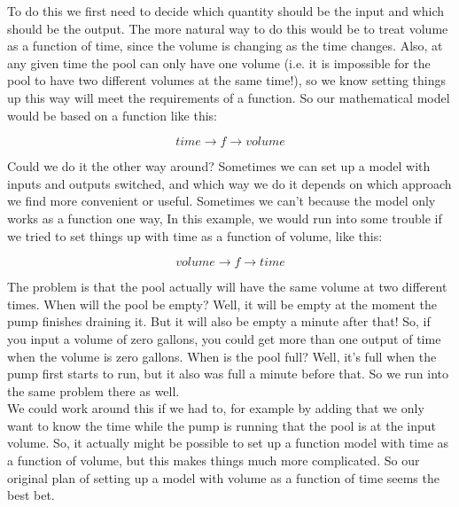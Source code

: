 To do this we first need to decide which quantity should be the input and which should be the output. The more natural way to do this would be to treat volume as a function of time, since the volume is changing as the time changes. Also, at any given time the pool can only have one volume (i.e. it is impossible for the pool to have two different volumes at the same time!), so we know setting things up this way will meet the requirements of a function. So our mathematical model would be based on a function like this:

\begin{equation*}
	time \rightarrow \boxed{f} \rightarrow volume
\end{equation*}

Could we do it the other way around? Sometimes we can set up a model with inputs and outputs switched, and which way we do it depends on which approach we find more convenient or useful.  Sometimes we can’t because the model only works as a function one way, In this example, we would run into some trouble if we tried to set things up with time as a function of volume, like this:

\begin{equation*}
	volume \rightarrow \boxed{f} \rightarrow time
\end{equation*}

The problem is that the pool actually will have the same volume at two different times. When will the pool be empty? Well, it will be empty at the moment the pump finishes draining it. But it will also be empty a minute after that! So, if you input a volume of zero gallons, you could get more than one output of time when the volume is zero gallons. When is the pool full? Well, it’s full when the pump first starts to run, but it also was full a minute before that. So we run into the same
problem there as well.\\

We could work around this if we had to, for example by adding that we only want to know the time while the pump is running that the pool is at the input volume. So, it actually might be possible to set up a function model with time as a function of volume, but this makes things much more complicated. So our original plan of setting up a model with volume as a function of time seems the best bet.


